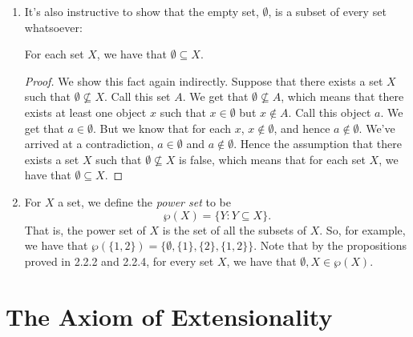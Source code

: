 \begin{enumerate}[{\thesection}.1]
\item It's also instructive to show that the empty set, $\emptyset$, is a subset of every set whatsoever:
\begin{proposition}\label{proposition:1.empty}
For each set $X$, we have that $\emptyset\subseteq X$.
\end{proposition}
\begin{proof}
We show this fact again indirectly. Suppose that there exists a set $X$ such that $\emptyset\nsubseteq X$. Call this set $A$. We get that $\emptyset\nsubseteq A$, which means that there exists at least one object $x$ such that $x\in \emptyset$ but $x\notin A$. Call this object $a$. We get that $a\in \emptyset$. But we know that for each $x$, $x\notin \emptyset$, and hence $a\notin \emptyset$. We've arrived at a contradiction, $a\in \emptyset$ and $a\notin\emptyset$. Hence the assumption that there exists a set $X$ such that $\emptyset\nsubseteq X$ is false, which means that for each set $X$, we have that $\emptyset\subseteq X$.
\end{proof}

\item For $X$ a set, we define the \emph{power set} to be \[\wp(X)=\{Y: Y\subseteq X\}.\] That is, the power set of $X$ is the set of all the subsets of $X$. So, for example, we have that $\wp(\{1,2\})=\{\emptyset, \{1\}, \{2\}, \{1,2\}\}$. Note that by the propositions proved in 2.2.2 and 2.2.4, for every set $X$, we have that $\emptyset, X\in \wp(X)$.

\end{enumerate}

\section{The Axiom of Extensionality}

